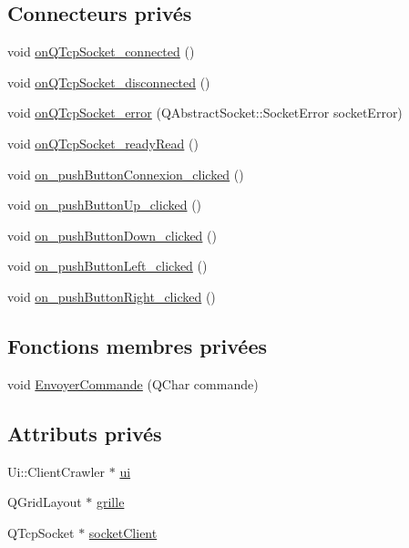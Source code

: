 \subsection*{Connecteurs privés}
\begin{DoxyCompactItemize}
\item 
void \hyperlink{class_client_crawler_a36dfc3748d2b194d6e201516bbf661cf}{on\+Q\+Tcp\+Socket\+\_\+connected} ()
\item 
void \hyperlink{class_client_crawler_a400f8b758b96d56bf692a0f86cea524b}{on\+Q\+Tcp\+Socket\+\_\+disconnected} ()
\item 
void \hyperlink{class_client_crawler_abfd261801481d2315478a9d903f16587}{on\+Q\+Tcp\+Socket\+\_\+error} (Q\+Abstract\+Socket\+::\+Socket\+Error socket\+Error)
\item 
void \hyperlink{class_client_crawler_a9e19e93f5eaefcfda0ec3e8567f3d423}{on\+Q\+Tcp\+Socket\+\_\+ready\+Read} ()
\item 
void \hyperlink{class_client_crawler_a0a5fe0345063d04e2c9acc5734b4a0d6}{on\+\_\+push\+Button\+Connexion\+\_\+clicked} ()
\item 
void \hyperlink{class_client_crawler_a832bf9d34a93b10784f3564be2346adf}{on\+\_\+push\+Button\+Up\+\_\+clicked} ()
\item 
void \hyperlink{class_client_crawler_a3f9ad2ca60a388d5d3d0436af7dd3756}{on\+\_\+push\+Button\+Down\+\_\+clicked} ()
\item 
void \hyperlink{class_client_crawler_aadabe491ca10e5499026d3b1b0de99a9}{on\+\_\+push\+Button\+Left\+\_\+clicked} ()
\item 
void \hyperlink{class_client_crawler_a4deee7315beda4b1c67baf0801512dcc}{on\+\_\+push\+Button\+Right\+\_\+clicked} ()
\end{DoxyCompactItemize}
\subsection*{Fonctions membres privées}
\begin{DoxyCompactItemize}
\item 
void \hyperlink{class_client_crawler_a257f1a01d1a6f032f430112e14110048}{Envoyer\+Commande} (Q\+Char commande)
\end{DoxyCompactItemize}
\subsection*{Attributs privés}
\begin{DoxyCompactItemize}
\item 
Ui\+::\+Client\+Crawler $\ast$ \hyperlink{class_client_crawler_a6263947f12b0ca34753f4cbb43d6d4fd}{ui}
\item 
Q\+Grid\+Layout $\ast$ \hyperlink{class_client_crawler_ac32bb3ac1812334a2232d462f65e28d2}{grille}
\item 
Q\+Tcp\+Socket $\ast$ \hyperlink{class_client_crawler_a7796ea05089d10bd1c5a6158b8cd8c89}{socket\+Client}
\end{DoxyCompactItemize}


